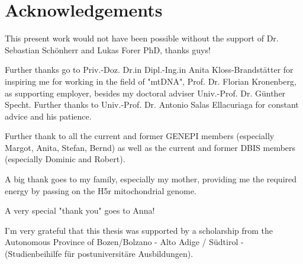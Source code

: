 \section*{Acknowledgements}


This present work would not have been possible without the support of Dr. Sebastian Sch\"onherr and Lukas Forer PhD, thanks guys! 

Further thanks go to Priv.-Doz. Dr.in Dipl.-Ing.in Anita Kloss-Brandst\"atter for inspiring me for working in the field of "mtDNA", Prof. Dr. Florian Kronenberg, as supporting employer, besides my doctoral adviser Univ.-Prof. Dr. G\"unther Specht. Further thanks to Univ.-Prof. Dr. Antonio Salas Ellacuriaga for constant advice and his patience.

Further thank to all the current and former GENEPI members (especially Margot, Anita, Stefan, Bernd) as well as the current and former DBIS members (especially Dominic and Robert).

A big thank goes to my family, especially my mother, providing me the required energy by passing on the H5r mitochondrial genome. 

A very special "thank you" goes to Anna! 

I'm very grateful that this thesis was supported by a scholarship from the Autonomous Province of Bozen/Bolzano - Alto Adige / S\"udtirol - (Studienbeihilfe f\"ur postuniversit\"are Ausbildungen). 

 
%
\cleardoublepage
